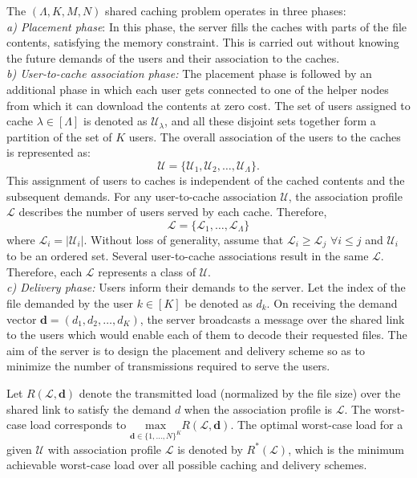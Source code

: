 \documentclass[conference,a4paper,10pt]{IEEEtran}
\begin{document}
The $(\Lambda, K,M,N)$ shared caching problem operates in three phases:\\
\textit{a) Placement phase}: In this phase, the server fills the caches with parts of the file contents, satisfying the memory constraint. This is carried out without knowing the future demands of the users and their association to the caches.\\
\textit{b) User-to-cache association phase:} The placement phase is followed by an additional phase in which each user gets connected to one of the helper nodes from which it can download the contents at zero cost. The set of users assigned to cache $\lambda \in [\Lambda]$ is denoted as $\mathcal{U}_{\lambda}$, and all these disjoint sets together form a partition of the set of $K$ users. The overall association of the users to the caches is represented as:
\begin{equation*}
\mathcal{U} = \{\mathcal{U}_1, \mathcal{U}_2,\ldots, \mathcal{U}_{\Lambda}\}.
\end{equation*}
This assignment of users to caches is independent of the cached contents and the subsequent demands. For any user-to-cache association $\mathcal{U}$, the association profile $\mathcal{L}$ describes the number of users served by each cache. Therefore,
\begin{equation*}
\mathcal{L} = \{\mathcal{L}_1, \ldots, \mathcal{L}_{\Lambda}\}
\end{equation*}
where $\mathcal{L}_i = |\mathcal{U}_i|$. Without loss of generality, assume that $\mathcal{L}_i \geq \mathcal{L}_j$ $\forall i\leq j$ and $\mathcal{U}_i$ to be an ordered set.
Several user-to-cache associations result in the same $\mathcal{L}$. Therefore, each $\mathcal{L}$ represents a class of $\mathcal{U}$. \\
\textit{c) Delivery phase:} Users inform their demands to the server. Let the index of the file demanded by the user $k \in [K]$ be denoted as $d_k$. On receiving the demand vector $\mathbf{d}=(d_1,d_2,\ldots,d_K)$, the server broadcasts a message over the shared link to the users which would enable each of them to decode their requested files. The aim of the server is to design the placement and delivery scheme so as to minimize the number of transmissions required to serve the users. 

Let $R(\mathcal{L},\mathbf{d})$ denote the transmitted load (normalized by the file size) over the shared link to satisfy the demand $d$ when the association profile is $\mathcal{L}$. The worst-case load corresponds to $\underset{\mathbf{d}\in\{1,\ldots,N\}^{K}}{\textrm{max}}R(\mathcal{L},\mathbf{d})$. The optimal worst-case load for a given $\mathcal{U}$ with association profile $\mathcal{L}$ is denoted by $R^{*}(\mathcal{L})$, which is the minimum achievable worst-case load over all possible caching and delivery schemes.
\end{document}
